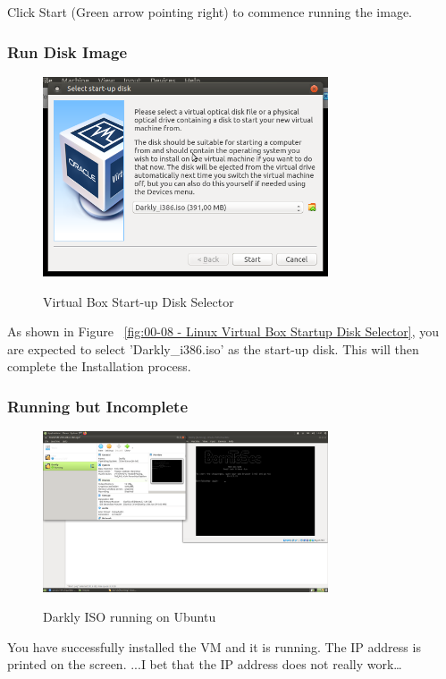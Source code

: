 Click Start (Green arrow pointing right) to commence running the image.

\subsubsection{Run Disk Image}
\begin{figure}[!htb]
    \centering
    \includegraphics[width=0.752\textwidth]{images/00-08.png}\\[0cm]  
    \caption[Virtual Box]{Virtual Box Start-up Disk Selector}
    \label{fig:00-08 - Linux Virtual Box Startup Disk Selector} 
\end{figure}
As shown in Figure ~\vref{fig:00-08 - Linux Virtual Box Startup Disk Selector},
you are expected to select 'Darkly\_i386.iso' as the start-up disk. This will
then complete the Installation process.

\subsubsection{Running but Incomplete}
\begin{figure}[!htb]
    \centering
    \includegraphics[width=0.752\textwidth]{images/00-09.png}\\[0cm]  
    \caption[Virtual Box]{Darkly ISO running on Ubuntu}
    \label{fig:00-09 - Linux Virtual Box Running not complete} 
\end{figure}
You have successfully installed the VM and it is running. The IP address is
printed on the screen. ...I bet that the IP address does not really work\dots\\

